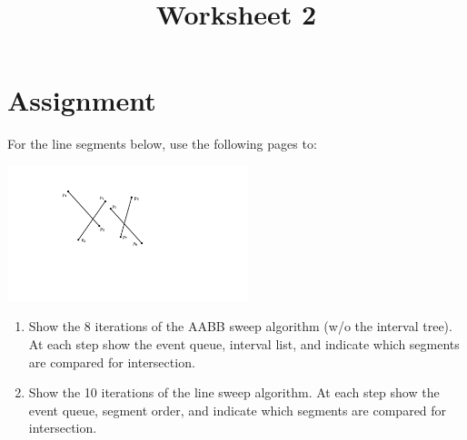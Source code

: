 \documentclass[a4paper,12pt]{article}
\title{Worksheet 2}
\begin{document}
\maketitle

\worksheetGroundRules


\vspace{5pt}
\section{Assignment}

\vspace{10pt}
\hspace{0.5cm} For the line segments below, use the following pages to:

\begin{center}
\includegraphics[width=7cm]{../images/linesweep.pdf}
\end{center}

\begin{enumerate}

\item Show the 8 iterations of the AABB sweep algorithm (w/o the interval tree). At each step show the event queue, interval list, and indicate which segments are compared for intersection.

\item Show the 10 iterations of the line sweep algorithm. At each step show the event queue, segment order, and indicate which segments are compared for intersection.



\end{enumerate}

\worksheetSubmission


\newpage
\end{document}
